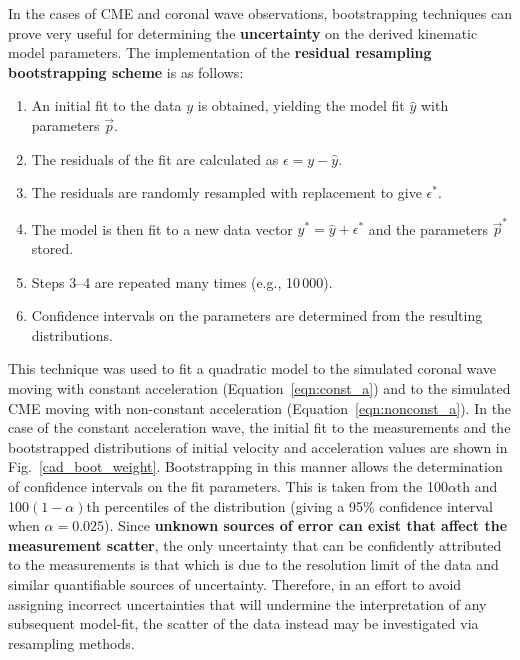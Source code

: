 \documentclass[structabstract]{aa}
\begin{document}
In the cases of CME and coronal wave observations, bootstrapping techniques can prove very useful for determining the {\bf uncertainty} on the derived kinematic model parameters. The implementation of the {\bf residual resampling bootstrapping scheme} is as follows:
\begin{enumerate}
\item An initial fit to the data $y$ is obtained, yielding the model fit $\hat{y}$ with parameters $\vec{p}$.
\item The residuals of the fit are calculated as $\epsilon = y - \hat{y}$.
\item The residuals are randomly resampled with replacement to give $\epsilon^*$.
\item The model is then fit to a new data vector $y^* = \hat{y} + \epsilon^*$ and the parameters $\vec{p}^*$ stored.
\item Steps 3--4 are repeated many times (e.g., 10\,000).
\item Confidence intervals on the parameters are determined from the resulting distributions.
\end{enumerate}
This technique was used to fit a quadratic model to the simulated coronal wave moving with constant acceleration (Equation~\ref{eqn:const_a}) and to the simulated CME moving with non-constant acceleration (Equation~\ref{eqn:nonconst_a}). In the case of the constant acceleration wave, the initial fit to the measurements and the bootstrapped distributions of initial velocity and acceleration values are shown in Fig.~\ref{cad_boot_weight}. Bootstrapping in this manner allows the determination of confidence intervals on the fit parameters. This is taken from the 100$\alpha$th and 100$\left(1-\alpha\right)$th percentiles of the distribution (giving a 95\% confidence interval when $\alpha=0.025$). Since {\bf unknown sources of error can exist that affect the measurement scatter}, the only uncertainty that can be confidently attributed to the measurements is that which is due to the resolution limit of the data and similar quantifiable sources of uncertainty. Therefore, in an effort to avoid assigning incorrect uncertainties that will undermine the interpretation of any subsequent model-fit, the scatter of the data instead may be investigated via resampling methods.
\end{document}
